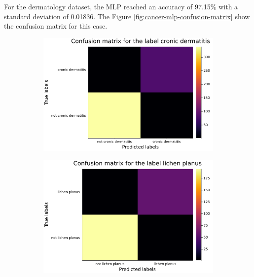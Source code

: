 \documentclass[12pt,a4paper]{article}
\begin{document}
For the dermatology dataset, the MLP reached an accuracy of 97.15\% with a standard deviation of 0.01836. The Figure \ref{fig:cancer-mlp-confusion-matrix} show the confusion matrix for this case.
\begin{figure}[H]
    \centering
    
    \begin{subfigure}{0.6\textwidth}
        \includegraphics[scale=.4]{../trab5 (MLP)/figs/dermatology-cronic dermatitis-confusion-matrix.png}
        \label{subfig:itema}
    \end{subfigure}
\end{figure}    
\begin{figure}[H]\ContinuedFloat
    \centering
    \begin{subfigure}{0.6\textwidth}
        \includegraphics[scale=.4]{../trab5 (MLP)/figs/dermatology-lichen planus-confusion-matrix.png}
        \label{subfig:itemb}
    \end{subfigure}

\end{figure}
\end{document}
